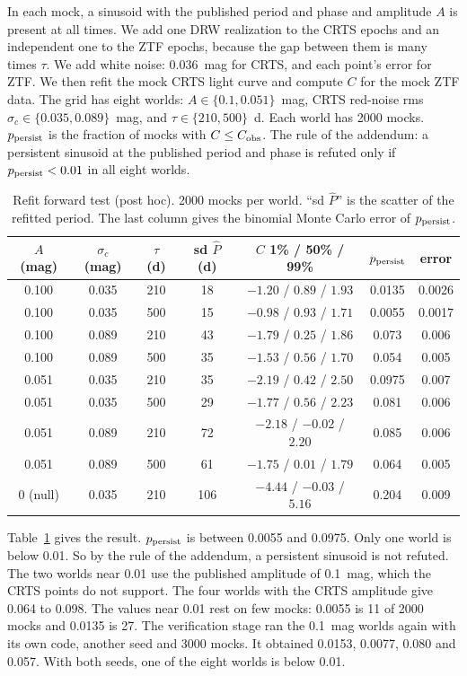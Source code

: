 \documentclass[11pt]{article}
\newcommand{\Cobs}{C_{\rm obs}}
\newcommand{\ppers}{p_{\rm persist}}
\begin{document}
In each mock, a sinusoid with the published period and phase and amplitude $A$ is present at all times. We add one DRW realization to the CRTS epochs and an independent one to the ZTF epochs, because the gap between them is many times $\tau$. We add white noise: 0.036~mag for CRTS, and each point's error for ZTF. We then refit the mock CRTS light curve and compute $C$ for the mock ZTF data. The grid has eight worlds: $A \in \{0.1, 0.051\}$~mag, CRTS red-noise rms $\sigma_c \in \{0.035, 0.089\}$~mag, and $\tau \in \{210, 500\}$~d. Each world has 2000 mocks. $\ppers$ is the fraction of mocks with $C \le \Cobs$. The rule of the addendum: a persistent sinusoid at the published period and phase is refuted only if $\ppers < 0.01$ in all eight worlds.

\begin{table}[h]
\centering
\caption{Refit forward test (post hoc). 2000 mocks per world. ``sd $\hat P$'' is the scatter of the refitted period. The last column gives the binomial Monte Carlo error of $\ppers$.}
\label{tab:refit}
\begin{tabular}{ccccccc}
\toprule
$A$ (mag) & $\sigma_c$ (mag) & $\tau$ (d) & sd $\hat P$ (d) & $C$ 1\% / 50\% / 99\% & $\ppers$ & error \\
\midrule
0.100 & 0.035 & 210 & 18 & $-1.20$ / $0.89$ / $1.93$ & 0.0135 & 0.0026 \\
0.100 & 0.035 & 500 & 15 & $-0.98$ / $0.93$ / $1.71$ & 0.0055 & 0.0017 \\
0.100 & 0.089 & 210 & 43 & $-1.79$ / $0.25$ / $1.86$ & 0.073 & 0.006 \\
0.100 & 0.089 & 500 & 35 & $-1.53$ / $0.56$ / $1.70$ & 0.054 & 0.005 \\
0.051 & 0.035 & 210 & 35 & $-2.19$ / $0.42$ / $2.50$ & 0.0975 & 0.007 \\
0.051 & 0.035 & 500 & 29 & $-1.77$ / $0.56$ / $2.23$ & 0.081 & 0.006 \\
0.051 & 0.089 & 210 & 72 & $-2.18$ / $-0.02$ / $2.20$ & 0.085 & 0.006 \\
0.051 & 0.089 & 500 & 61 & $-1.75$ / $0.01$ / $1.79$ & 0.064 & 0.005 \\
\midrule
0 (null) & 0.035 & 210 & 106 & $-4.44$ / $-0.03$ / $5.16$ & 0.204 & 0.009 \\
\bottomrule
\end{tabular}
\end{table}

Table~\ref{tab:refit} gives the result. $\ppers$ is between 0.0055 and 0.0975. Only one world is below 0.01. So by the rule of the addendum, a persistent sinusoid is not refuted. The two worlds near 0.01 use the published amplitude of 0.1~mag, which the CRTS points do not support. The four worlds with the CRTS amplitude give 0.064 to 0.098. The values near 0.01 rest on few mocks: 0.0055 is 11 of 2000 mocks and 0.0135 is 27. The verification stage ran the 0.1~mag worlds again with its own code, another seed and 3000 mocks. It obtained 0.0153, 0.0077, 0.080 and 0.057. With both seeds, one of the eight worlds is below 0.01.
\end{document}
